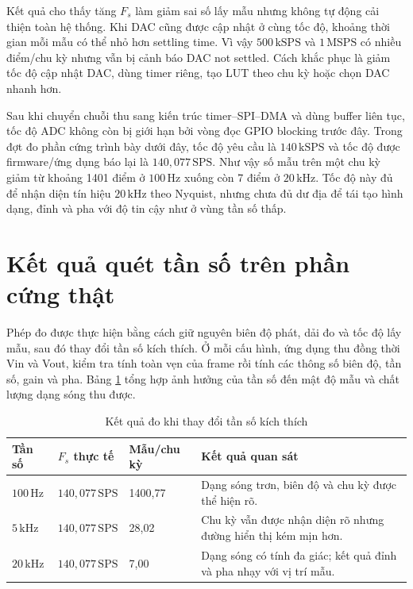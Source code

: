 \documentclass[12pt,a4paper]{report}
\newcommand{\unit}[1]{\,\mathrm{#1}}
\newcommand{\tableheadcolor}{\rowcolor{gray!18}}
\begin{document}
Kết quả cho thấy tăng $F_s$ làm giảm sai số lấy mẫu nhưng không tự động cải thiện toàn hệ thống. Khi DAC cũng được cập nhật ở cùng tốc độ, khoảng thời gian mỗi mẫu có thể nhỏ hơn settling time. Vì vậy $500\unit{kSPS}$ và $1\unit{MSPS}$ có nhiều điểm/chu kỳ nhưng vẫn bị cảnh báo DAC not settled. Cách khắc phục là giảm tốc độ cập nhật DAC, dùng timer riêng, tạo LUT theo chu kỳ hoặc chọn DAC nhanh hơn.

Sau khi chuyển chuỗi thu sang kiến trúc timer--SPI--DMA và dùng buffer liên tục, tốc độ ADC không còn bị giới hạn bởi vòng đọc GPIO blocking trước đây. Trong đợt đo phần cứng trình bày dưới đây, tốc độ yêu cầu là $140\unit{kSPS}$ và tốc độ được firmware/ứng dụng báo lại là $140{,}077\unit{SPS}$. Như vậy số mẫu trên một chu kỳ giảm từ khoảng 1401 điểm ở $100\unit{Hz}$ xuống còn 7 điểm ở $20\unit{kHz}$. Tốc độ này đủ để nhận diện tín hiệu $20\unit{kHz}$ theo Nyquist, nhưng chưa đủ dư địa để tái tạo hình dạng, đỉnh và pha với độ tin cậy như ở vùng tần số thấp.

\section{Kết quả quét tần số trên phần cứng thật}
\label{sec:real_frequency}
Phép đo được thực hiện bằng cách giữ nguyên biên độ phát, dải đo và tốc độ lấy
mẫu, sau đó thay đổi tần số kích thích. Ở mỗi cấu hình, ứng dụng thu đồng thời
Vin và Vout, kiểm tra tính toàn vẹn của frame rồi tính các thông số biên độ,
tần số, gain và pha. Bảng \ref{tab:real_frequency_cases} tổng hợp ảnh hưởng của
tần số đến mật độ mẫu và chất lượng dạng sóng thu được.

\begin{table}[H]
\centering
\caption{Kết quả đo khi thay đổi tần số kích thích}
\label{tab:real_frequency_cases}
\begin{tabularx}{\textwidth}{|p{2.3cm}|p{2.6cm}|p{2.4cm}|X|}
\hline
\tableheadcolor\textbf{Tần số} & \textbf{$F_s$ thực tế} & \textbf{Mẫu/chu kỳ} & \textbf{Kết quả quan sát} \\ \hline
$100\unit{Hz}$ & $140{,}077\unit{SPS}$ & 1400,77 & Dạng sóng trơn, biên độ và chu kỳ được thể hiện rõ. \\ \hline
$5\unit{kHz}$ & $140{,}077\unit{SPS}$ & 28,02 & Chu kỳ vẫn được nhận diện rõ nhưng đường hiển thị kém mịn hơn. \\ \hline
$20\unit{kHz}$ & $140{,}077\unit{SPS}$ & 7,00 & Dạng sóng có tính đa giác; kết quả đỉnh và pha nhạy với vị trí mẫu. \\ \hline
\end{tabularx}
\end{table}
\end{document}
